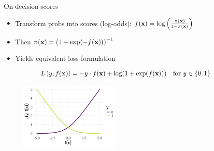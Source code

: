 \documentclass[11pt,compress,t,notes=noshow, xcolor=table]{beamer}
\begin{document}
\begin{vbframe}{On decision scores}

\begin{itemize}
    \item Transform probs into scores (log-odds): $f(\mathbf{x}) = \log\left(\frac{\pi(\mathbf{x})}{1 - \pi(\mathbf{x})}\right)$
    \item Then $\pi(\mathbf{x}) = \left(1 + \exp(-f(\mathbf{x}))\right)^{-1}$
    \item Yields equivalent loss formulation
\end{itemize}
$$L\left(y, f(\mathbf{x})\right) = - y \cdot f(\mathbf{x}) + \log(1 + \exp(f(\mathbf{x}))) \quad \text{for } y \in \{0, 1\}$$

\lz

\begin{center}
\begin{figure}
  \includegraphics[width=0.45\textwidth]{figure/bernoulli_logloss.png}\\
\end{figure}
\end{center}

\end{vbframe}
\end{document}
